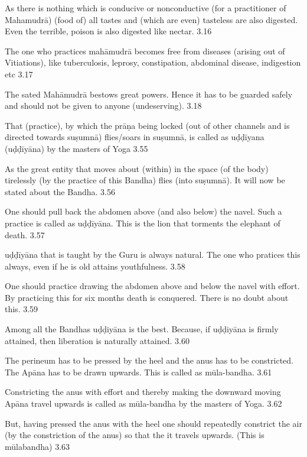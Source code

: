 As there is nothing which is conducive or nonconductive (for a practitioner of Mahamudrā) (food of)  all tastes and (which are even) tasteless are also digested. Even the terrible, poison is also digested like nectar. 3.16

The one who practices mahāmudrā becomes free from diseases (arising out of Vitiations), like tuberculosis, leprosy, constipation, abdominal disease, indigestion etc  3.17

The sated Mahāmudrā bestows great powers. Hence it has to be guarded safely and should not be given to anyone (undeserving). 3.18


That (practice), by which the prāṇa being locked (out of other channels and is directed towards suṣumnā) flies/soars in suṣumnā, is called as uḍḍīyana (uḍḍīyāna) by the masters of Yoga 3.55

As the great entity that moves about (within) in the space (of the body) tirelessly (by the practice of this Bandha) flies (into suṣumnā). It will now be stated about the Bandha. 3.56

One should pull back the abdomen above (and also below) the navel. Such a practice is called as uḍḍīyāna. This is the lion that torments the elephant of death. 3.57

uḍḍīyāna that is taught by the Guru is always natural. The one who pratices this always, even if he is old attains youthfulness. 3.58

One should practice drawing the abdomen above and below the navel with effort. By practicing this for six months death is conquered. There is no doubt about this. 3.59


Among all the Bandhas uḍḍiyāna is the best. Because, if uḍḍiyāna is firmly attained, then liberation is naturally attained.  3.60


The perineum has to be pressed by the heel and the anus has to be constricted. The Apāna has to be drawn upwards. This is called as mūla-bandha. 3.61

Constricting the anus with effort and thereby making the downward moving Apāna travel upwards is called as mūla-bandha by the masters of Yoga. 3.62

But, having pressed the anus with the heel one should repeatedly constrict the air (by the constriction of the anus) so that the it travels upwards. (This is mūlabandha)  3.63

